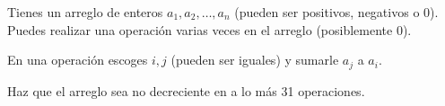 \begin{problem}
    Tienes un arreglo de enteros $a_1,a_2, \ldots, a_n$ (pueden ser positivos, negativos o 0).
    Puedes realizar una operaci\'on varias veces en el arreglo (posiblemente 0). 

    En una operaci\'on escoges $i,j$ (pueden ser iguales) y sumarle $a_j$ a $a_i$. 

    Haz que el arreglo sea no decreciente en a lo m\'as 31 operaciones.

    \label{1854CFA2}
\end{problem}